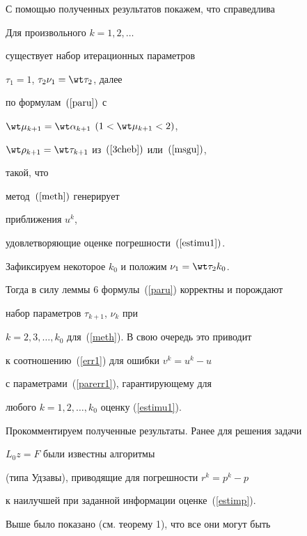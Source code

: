 С помощью полученных результатов покажем, что справедлива





\begin{thm} Для произвольного $k = 1, 2, \dotsc$


существует набор итерационных параметров


$\tau_1 =1$, $\tau_2 \nu_1 = \wt \tau_2$, далее


по формулам~$(\ref{paru})$ с


$\wt \mu_{k+1} = \wt \alpha_{k+1}$ $(1 < \wt \mu_{k+1} < 2)$,


$\wt \rho_{k+1} = \wt \tau_{k+1}$ из~$(\ref{3cheb})$ или~$(\ref{msgu})$,


такой, что


метод~$(\ref{meth})$ генерирует


приближения $u^k$,


удовлетворяющие оценке погрешности~$(\ref{estimu1})$.


\end{thm}





\begin{pf}


Зафиксируем некоторое $k_0$ и положим $\nu_1 = \wt \tau_2 k_0$.


Тогда в силу леммы 6 формулы~(\ref{paru}) корректны и порождают


набор параметров $\tau_{k+1}$, $\nu_k$ при


$k = 2, 3, \dotsc, k_0 $ для~(\ref{meth}). В свою очередь это приводит


к соотношению~(\ref{err1}) для ошибки $v^k = u^k - u$


с параметрами~(\ref{parerr1}), гарантирующему для


любого $k = 1, 2, \dots, k_0$ оценку (\ref{estimu1}).


\end{pf}





Прокомментируем полученные результаты. Ранее для решения задачи


$L_0 z = F $ были известны алгоритмы


(типа Удзавы), приводящие для погрешности $r^k = p^k - p$


к наилучшей при заданной информации оценке~(\ref{estimp}).


Выше было показано (см. теорему 1), что все они могут быть


